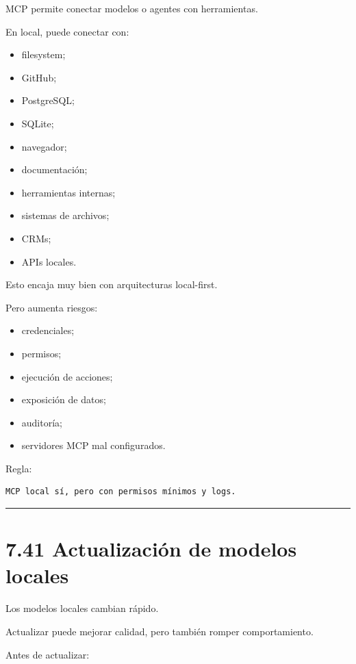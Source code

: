 MCP permite conectar modelos o agentes con herramientas.

En local, puede conectar con:

\begin{itemize}
\tightlist
\item
  filesystem;
\item
  GitHub;
\item
  PostgreSQL;
\item
  SQLite;
\item
  navegador;
\item
  documentación;
\item
  herramientas internas;
\item
  sistemas de archivos;
\item
  CRMs;
\item
  APIs locales.
\end{itemize}

Esto encaja muy bien con arquitecturas local-first.

Pero aumenta riesgos:

\begin{itemize}
\tightlist
\item
  credenciales;
\item
  permisos;
\item
  ejecución de acciones;
\item
  exposición de datos;
\item
  auditoría;
\item
  servidores MCP mal configurados.
\end{itemize}

Regla:

\begin{lstlisting}
MCP local sí, pero con permisos mínimos y logs.
\end{lstlisting}

\begin{center}\rule{0.5\linewidth}{0.5pt}\end{center}

\section{7.41 Actualización de modelos
locales}\label{actualizaciuxf3n-de-modelos-locales}

Los modelos locales cambian rápido.

Actualizar puede mejorar calidad, pero también romper comportamiento.

Antes de actualizar:

